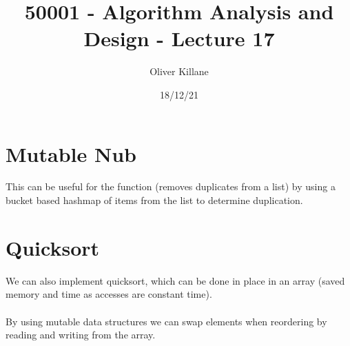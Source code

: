 \documentclass{report}
\title{50001 - Algorithm Analysis and Design - Lecture 17}
\author{Oliver Killane}
\date{18/12/21}
\begin{document}
    \maketitle

    \section*{Mutable Nub}
        This can be useful for the  function (removes duplicates from a list) by using a bucket based hashmap of items from the list to determine duplication.

    \section*{Quicksort}
        We can also implement quicksort, which can be done in place in an array 
        (saved memory and time as accesses are constant time).
        \\
        \\ By using mutable data structures we can swap elements when reordering by reading and writing from the array.
\end{document}
